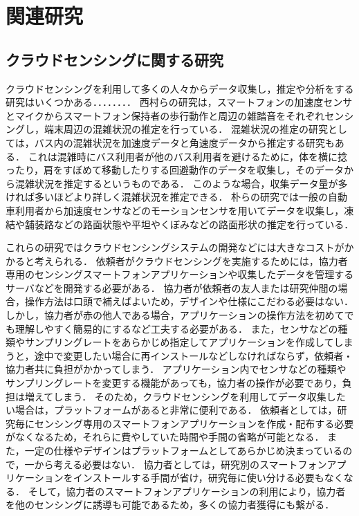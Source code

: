 \thispagestyle{myheadings}
\chapter{関連研究}
\label{sec:format}


\section{クラウドセンシングに関する研究}
\label{sec:format_thesis}
クラウドセンシングを利用して多くの人々からデータ収集し，推定や分析をする研究はいくつかある．．．．．．．．
西村らの研究\cite{ura}は，スマートフォンの加速度センサとマイクからスマートフォン保持者の歩行動作と周辺の雑踏音をそれぞれセンシングし，端末周辺の混雑状況の推定を行っている．
混雑状況の推定の研究としては，バス内の混雑状況を加速度データと角速度データから推定する研究\cite{hoso}もある．
これは混雑時にバス利用者が他のバス利用者を避けるために，体を横に捻ったり，肩をすぼめて移動したりする回避動作のデータを収集し，そのデータから混雑状況を推定するというものである．
このような場合，収集データ量が多ければ多いほどより詳しく混雑状況を推定できる．
朴らの研究\cite{paku}では一般の自動車利用者から加速度センサなどのモーションセンサを用いてデータを収集し，凍結や舗装路などの路面状態や平坦やくぼみなどの路面形状の推定を行っている．

これらの研究ではクラウドセンシングシステムの開発などには大きなコストがかかると考えられる．
依頼者がクラウドセンシングを実施するためには，協力者専用のセンシングスマートフォンアプリケーションや収集したデータを管理するサーバなどを開発する必要がある．
協力者が依頼者の友人または研究仲間の場合，操作方法は口頭で補えばよいため，デザインや仕様にこだわる必要はない．
しかし，協力者が赤の他人である場合，アプリケーションの操作方法を初めてでも理解しやすく簡易的にするなど工夫する必要がある．
また，センサなどの種類やサンプリングレートをあらかじめ指定してアプリケーションを作成してしまうと，途中で変更したい場合に再インストールなどしなければならず，依頼者・協力者共に負担がかかってしまう．
アプリケーション内でセンサなどの種類やサンプリングレートを変更する機能があっても，協力者の操作が必要であり，負担は増えてしまう．
そのため，クラウドセンシングを利用してデータ収集したい場合は，プラットフォームがあると非常に便利である．
依頼者としては，研究毎にセンシング専用のスマートフォンアプリケーションを作成・配布する必要がなくなるため，それらに費やしていた時間や手間の省略が可能となる．
また，一定の仕様やデザインはプラットフォームとしてあらかじめ決まっているので，一から考える必要はない．
協力者としては，研究別のスマートフォンアプリケーションをインストールする手間が省け，研究毎に使い分ける必要もなくなる．
そして，協力者のスマートフォンアプリケーションの利用により，協力者を他のセンシングに誘導も可能であるため，多くの協力者獲得にも繋がる．


